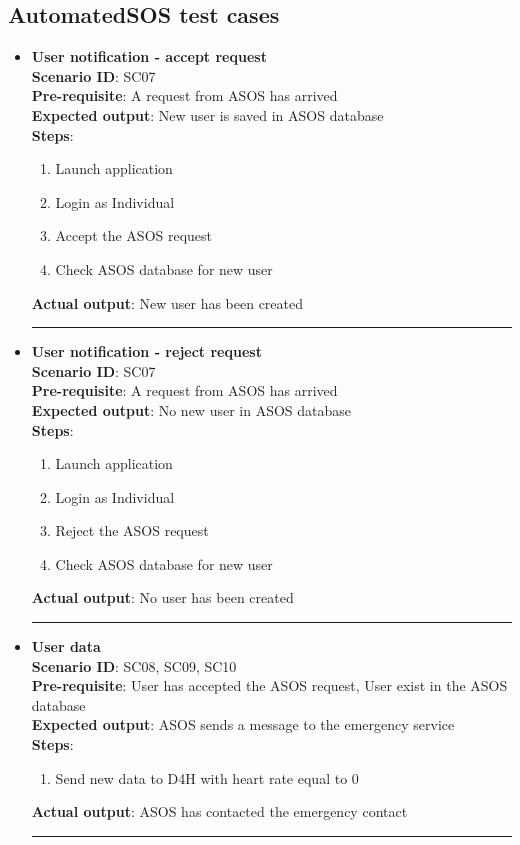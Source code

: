 \documentclass[a4paper, hidelinks, 12pt]{report}
\begin{document}
\subsection{AutomatedSOS test cases}
\begin{itemize}
		\item{\textbf{User notification - accept request}} \\
		\textbf{Scenario ID}: SC07 \\
		\textbf{Pre-requisite}: A request from ASOS has arrived \\
		\textbf{Expected output}: New user is saved in ASOS database\\
		\textbf{Steps}:
		\begin{enumerate}
			\item{Launch application}
			\item{Login as Individual}
			\item{Accept the ASOS request}
			\item{Check ASOS database for new user}
		\end{enumerate}
		\textbf{Actual output}: New user has been created \\
		\rule{\linewidth}{0.4pt}

		\item{\textbf{User notification - reject request}} \\
		\textbf{Scenario ID}: SC07 \\
		\textbf{Pre-requisite}: A request from ASOS has arrived \\
		\textbf{Expected output}: No new user in ASOS database\\
		\textbf{Steps}:
		\begin{enumerate}
			\item{Launch application}
			\item{Login as Individual}
			\item{Reject the ASOS request}
			\item{Check ASOS database for new user}
		\end{enumerate}
		\textbf{Actual output}: No user has been created \\
		\rule{\linewidth}{0.4pt}

		\item{\textbf{User data}} \\
		\textbf{Scenario ID}: SC08, SC09, SC10 \\
		\textbf{Pre-requisite}: User has accepted the ASOS request, User exist in the ASOS database \\
		\textbf{Expected output}: ASOS sends a message to the emergency service\\
		\textbf{Steps}:
		\begin{enumerate}
			\item{Send new data to D4H with heart rate equal to 0}
		\end{enumerate}
		\textbf{Actual output}: ASOS has contacted the emergency contact \\
		\rule{\linewidth}{0.4pt}

\end{itemize}
\end{document}
